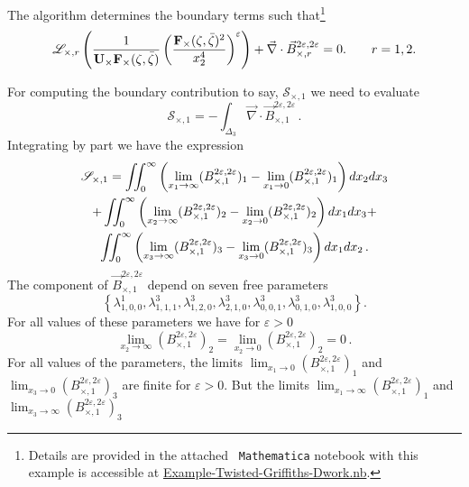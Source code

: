 \documentclass[a4paper,12pt]{article}
\numberwithin{equation}{section}
\numberwithin{figure}{section}
\begin{document}
 The algorithm determines the boundary terms 
 such that\footnote{Details are provided in the  attached {\tt
     Mathematica}  notebook with  this example is accessible at \href{Example-Twisted-Griffiths-Dwork.nb}{Example-Twisted-Griffiths-Dwork.nb}.}
 \begin{equation}
   \mathscr{L}_{\times,r}    \left( {1\over \textbf{U}_\times
    \textbf{F}_\times (\zeta,\bar\zeta)} \left(
    \textbf{F}_\times (\zeta,\bar\zeta)^{2}\over
    x_2^{4}\right)^\varepsilon \right)+ \vec\nabla\cdot\vec B^{2\varepsilon,2\varepsilon}_{\times,r}=0.
\qquad r=1,2.
\end{equation}
%

For computing the boundary contribution to say, $
\mathscr{S}_{\times,1}$ we need to evaluate
\begin{equation}
    \mathscr{S}_{\times,1}=- \int_{\Delta_3} \vec\nabla\cdot\vec
    B^{2\varepsilon,2\varepsilon}_{\times,1}\,.
\end{equation}
Integrating by part we have the expression
\begin{multline}
    \mathscr{S}_{\times,1}=\iint_0^\infty
\left(\lim_{x_1\to\infty}
  (B^{2\varepsilon,2\varepsilon}_{\times,1})_1-\lim_{x_1\to0}
  (B^{2\varepsilon,2\varepsilon}_{\times,1})_1\right)dx_2dx_3\cr
+\iint_0^\infty
\left(\lim_{x_2\to\infty}
  (B^{2\varepsilon,2\varepsilon}_{\times,1})_2-\lim_{x_2\to0}
  (B^{2\varepsilon,2\varepsilon}_{\times,1})_2\right)dx_1dx_3
+\cr\iint_0^\infty
\left(\lim_{x_3\to\infty}
  (B^{2\varepsilon,2\varepsilon}_{\times,1})_3-\lim_{x_3\to0}
  (B^{2\varepsilon,2\varepsilon}_{\times,1})_3\right)dx_1dx_2\,.
\end{multline}
%
The component of $\vec B^{2\varepsilon,2\varepsilon}_{\times,1}$
depend on seven free parameters
\begin{equation}
  \label{e:varBcross}
  \left\{\lambda^1_{1,0,0},\lambda^3_{1,1,1},\lambda^3_{1,2,0},\lambda^3_{2,1,0},\lambda^3_{0,0,1},\lambda^3_{0,1,0},\lambda^3_{1,0,0}\right\}.
\end{equation}
For all values of these parameters we have for $\varepsilon>0$
\begin{equation}
    \lim_{x_2\to\infty}
  (B^{2\varepsilon,2\varepsilon}_{\times,1})_2=\lim_{x_2\to0}
  (B^{2\varepsilon,2\varepsilon}_{\times,1})_2=0\,.
\end{equation}
%
For all values of the parameters, the limits 
$\lim_{x_1\to0}(B^{2\varepsilon,2\varepsilon}_{\times,1})_1$ and $\lim_{x_3\to0}(B^{2\varepsilon,2\varepsilon}_{\times,1})_3$ 
are finite for $\varepsilon>0$.
But the limits $\lim_{x_1\to\infty}(B^{2\varepsilon,2\varepsilon}_{\times,1})_1$ and $\lim_{x_3\to\infty}(B^{2\varepsilon,2\varepsilon}_{\times,1})_3$ 
\end{document}
